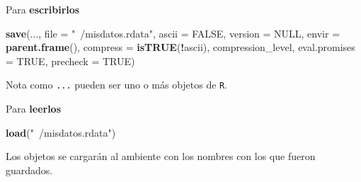 \documentclass[]{article}
\newenvironment{Shaded}{\begin{snugshade}}{\end{snugshade}}
\newcommand{\KeywordTok}[1]{\textcolor[rgb]{0.13,0.29,0.53}{\textbf{#1}}}
\newcommand{\DataTypeTok}[1]{\textcolor[rgb]{0.13,0.29,0.53}{#1}}
\newcommand{\StringTok}[1]{\textcolor[rgb]{0.31,0.60,0.02}{#1}}
\newcommand{\OtherTok}[1]{\textcolor[rgb]{0.56,0.35,0.01}{#1}}
\newcommand{\OperatorTok}[1]{\textcolor[rgb]{0.81,0.36,0.00}{\textbf{#1}}}
\newcommand{\NormalTok}[1]{#1}
\begin{document}
Para \textbf{escribirlos}

\begin{Shaded}
\begin{Highlighting}[]
\KeywordTok{save}\NormalTok{(..., }
     \DataTypeTok{file =} \StringTok{"~/misdatos.rdata"}\NormalTok{,}
     \DataTypeTok{ascii =} \OtherTok{FALSE}\NormalTok{, }\DataTypeTok{version =} \OtherTok{NULL}\NormalTok{, }\DataTypeTok{envir =} \KeywordTok{parent.frame}\NormalTok{(),}
     \DataTypeTok{compress =} \KeywordTok{isTRUE}\NormalTok{(}\OperatorTok{!}\NormalTok{ascii), compression_level,}
     \DataTypeTok{eval.promises =} \OtherTok{TRUE}\NormalTok{, }\DataTypeTok{precheck =} \OtherTok{TRUE}\NormalTok{)}
\end{Highlighting}
\end{Shaded}

Nota como \texttt{...} pueden ser uno o más objetos de \texttt{R}.

Para \textbf{leerlos}

\begin{Shaded}
\begin{Highlighting}[]
\KeywordTok{load}\NormalTok{(}\StringTok{"~/misdatos.rdata"}\NormalTok{)}
\end{Highlighting}
\end{Shaded}

Los objetos se cargarán al ambiente con los nombres con los que fueron
guardados.
\end{document}
